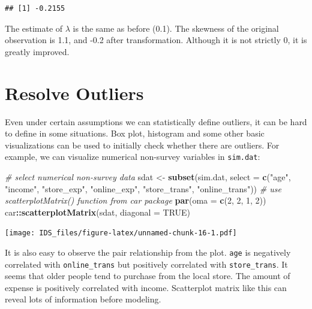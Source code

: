 \documentclass[12pt,]{krantz}
\makeatletter
\newenvironment{Shaded}{\begin{snugshade}}{\end{snugshade}}
\newcommand{\CommentTok}[1]{\textcolor[rgb]{0.37,0.37,0.37}{\textit{#1}}}
\newcommand{\DataTypeTok}[1]{\textcolor[rgb]{0.27,0.27,0.27}{#1}}
\newcommand{\DecValTok}[1]{\textcolor[rgb]{0.06,0.06,0.06}{#1}}
\newcommand{\KeywordTok}[1]{\textcolor[rgb]{0.27,0.27,0.27}{\textbf{#1}}}
\newcommand{\NormalTok}[1]{#1}
\newcommand{\OperatorTok}[1]{\textcolor[rgb]{0.43,0.43,0.43}{\textbf{#1}}}
\newcommand{\OtherTok}[1]{\textcolor[rgb]{0.37,0.37,0.37}{#1}}
\newcommand{\StringTok}[1]{\textcolor[rgb]{0.5,0.5,0.5}{#1}}
\newenvironment{kframe}{%
\medskip{}
\setlength{\fboxsep}{.8em}
 \def\at@end@of@kframe{}%
 \ifinner\ifhmode%
  \def\at@end@of@kframe{\end{minipage}}%
  \begin{minipage}{\columnwidth}%
 \fi\fi%
 \def\FrameCommand##1{\hskip\@totalleftmargin \hskip-\fboxsep
 \colorbox{shadecolor}{##1}\hskip-\fboxsep
     \hskip-\linewidth \hskip-\@totalleftmargin \hskip\columnwidth}%
 \MakeFramed {\advance\hsize-\width
   \@totalleftmargin\z@ \linewidth\hsize
   \@setminipage}}%
 {\par\unskip\endMakeFramed%
 \at@end@of@kframe}
\renewenvironment{Shaded}{\begin{kframe}}{\end{kframe}}
\makeatother
\begin{document}
\begin{verbatim}
## [1] -0.2155
\end{verbatim}

The estimate of \(\lambda\) is the same as before (0.1). The skewness of the original observation is 1.1, and -0.2 after transformation. Although it is not strictly 0, it is greatly improved.

\hypertarget{outliers}{%
\section{Resolve Outliers}\label{outliers}}

Even under certain assumptions we can statistically define outliers, it can be hard to define in some situations. Box plot, histogram and some other basic visualizations can be used to initially check whether there are outliers. For example, we can visualize numerical non-survey variables in \texttt{sim.dat}:

\begin{Shaded}
\begin{Highlighting}[]
\CommentTok{# select numerical non-survey data}
\NormalTok{sdat <-}\StringTok{ }\KeywordTok{subset}\NormalTok{(sim.dat, }\DataTypeTok{select =} \KeywordTok{c}\NormalTok{(}\StringTok{"age"}\NormalTok{, }\StringTok{"income"}\NormalTok{, }\StringTok{"store_exp"}\NormalTok{, }
    \StringTok{"online_exp"}\NormalTok{, }\StringTok{"store_trans"}\NormalTok{, }\StringTok{"online_trans"}\NormalTok{))}
\CommentTok{# use scatterplotMatrix() function from car package}
\KeywordTok{par}\NormalTok{(}\DataTypeTok{oma =} \KeywordTok{c}\NormalTok{(}\DecValTok{2}\NormalTok{, }\DecValTok{2}\NormalTok{, }\DecValTok{1}\NormalTok{, }\DecValTok{2}\NormalTok{))}
\NormalTok{car}\OperatorTok{::}\KeywordTok{scatterplotMatrix}\NormalTok{(sdat, }\DataTypeTok{diagonal =} \OtherTok{TRUE}\NormalTok{)}
\end{Highlighting}
\end{Shaded}

\texttt{[image: IDS\_files/figure-latex/unnamed-chunk-16-1.pdf]}

It is also easy to observe the pair relationship from the plot. \texttt{age} is negatively correlated with \texttt{online\_trans} but positively correlated with \texttt{store\_trans}. It seems that older people tend to purchase from the local store. The amount of expense is positively correlated with income. Scatterplot matrix like this can reveal lots of information before modeling.
\end{document}
